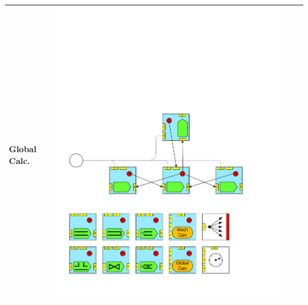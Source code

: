 \begin{table}
\begin{center}
\begin{tabular}{|p{2cm}|c|p{2cm}|c|}
Global Calc. 	&\includegraphics[page=18, scale=0.25]{./figs/1dcfd/ElementalProcessors.pdf} \\ \hline

\end{tabular}
\end{center}
\end{table}
